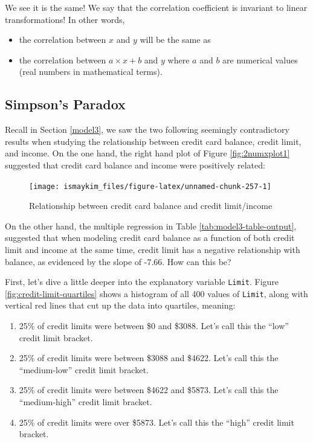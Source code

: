 \documentclass[12pt,]{krantz}
\providecommand{\tightlist}{%
  \setlength{\itemsep}{0pt}\setlength{\parskip}{0pt}}
\begin{document}
We see it is the same! We say that the correlation coefficient is
invariant to linear transformations! In other words,

\begin{itemize}
\tightlist
\item
  the correlation between \(x\) and \(y\) will be the same as
\item
  the correlation between \(a\times x + b\) and \(y\) where \(a\) and
  \(b\) are numerical values (real numbers in mathematical terms).
\end{itemize}

\subsection{Simpson's Paradox}\label{simpsonsparadox}

Recall in Section \ref{model3}, we saw the two following seemingly
contradictory results when studying the relationship between credit card
balance, credit limit, and income. On the one hand, the right hand plot
of Figure \ref{fig:2numxplot1} suggested that credit card balance and
income were positively related:

\begin{figure}

{\centering \texttt{[image: ismaykim\_files/figure-latex/unnamed-chunk-257-1]} 

}

\caption{Relationship between credit card balance and credit limit/income}\label{fig:unnamed-chunk-257}
\end{figure}

On the other hand, the multiple regression in Table
\ref{tab:model3-table-output}, suggested that when modeling credit card
balance as a function of both credit limit and income at the same time,
credit limit has a negative relationship with balance, as evidenced by
the slope of -7.66. How can this be?

First, let's dive a little deeper into the explanatory variable
\texttt{Limit}. Figure \ref{fig:credit-limit-quartiles} shows a
histogram of all 400 values of \texttt{Limit}, along with vertical red
lines that cut up the data into quartiles, meaning:

\begin{enumerate}
\def\labelenumi{\arabic{enumi}.}
\tightlist
\item
  25\% of credit limits were between \$0 and \$3088. Let's call this the
  ``low'' credit limit bracket.
\item
  25\% of credit limits were between \$3088 and \$4622. Let's call this
  the ``medium-low'' credit limit bracket.
\item
  25\% of credit limits were between \$4622 and \$5873. Let's call this
  the ``medium-high'' credit limit bracket.
\item
  25\% of credit limits were over \$5873. Let's call this the ``high''
  credit limit bracket.
\end{enumerate}
\end{document}

